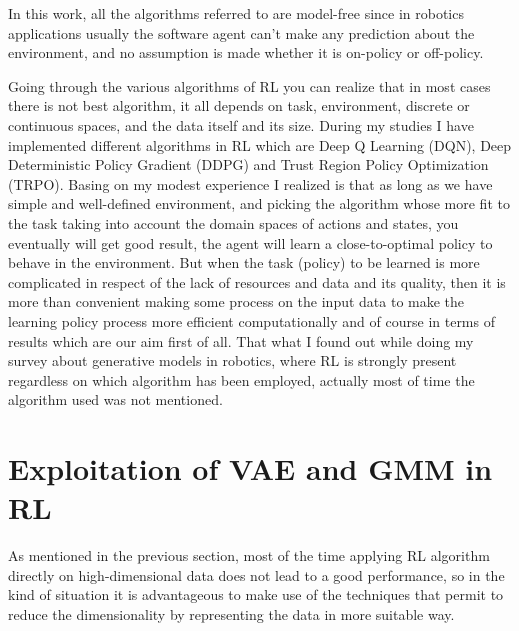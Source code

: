 In this work, all the algorithms referred to are model-free since in robotics applications usually the software agent can’t make any prediction about the environment, and no assumption is made whether it is on-policy or off-policy.

\vspace{0.3cm}
Going through the various algorithms of RL you can realize that in most cases there is not best algorithm, it all depends on task, environment, discrete or continuous spaces, and the data itself and its size. During my studies I have implemented different algorithms in RL which are Deep Q Learning (DQN), Deep Deterministic Policy Gradient (DDPG) and Trust Region Policy Optimization (TRPO). Basing on my modest experience I realized is that as long as we have simple and well-defined environment, and picking the algorithm whose more fit to the task taking into account the domain spaces of actions and states, you eventually will get good result, the agent will learn a close-to-optimal policy to behave in the environment. But when the task (policy) to be learned is more complicated in respect of the lack of resources and data and its quality, then it is more than convenient making some process on the input data to make the learning policy process more efficient computationally and of course in terms of results which are our aim first of all. That what I found out while doing my survey about generative models in robotics, where RL is strongly present regardless on which algorithm has been employed, actually most of time the algorithm used was not mentioned. 

\section{Exploitation of VAE and GMM in RL}
As mentioned in the previous section, most of the time applying RL algorithm directly on high-dimensional data does not lead to a good performance, so in the kind of situation it is advantageous to make use of the techniques that permit to reduce the dimensionality by representing the data in more suitable way.\\

